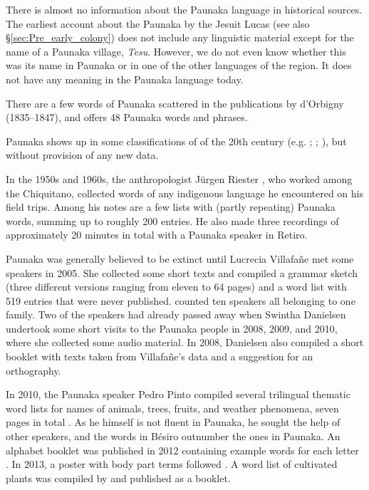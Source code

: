 There is almost no information about the Paunaka language in historical sources. The earliest account about the Paunaka by the Jesuit Lucas \citet[]{Matienzo_et_al2011} (see also §\ref{sec:Pre_early_colony}) does not include any linguistic material except for the name of a Paunaka village, \textit{Tesu}. However, we do not even know whether this was its name in Paunaka or in one of the other languages of the region. It does not have any meaning in the Paunaka language today.

There are a few words of Paunaka scattered in the publications by d’Orbigny (1835–1847), %
and \citet[308]{Cardus1886} offers 48 Paunaka words and phrases.

Paunaka shows up in some classifications of  of the 20th century (e.g. \citealt[213]{Mason1950}; %
\citealt[142]{Loukotka1968}; %
\citealt[67]{Aikhenvald1999}), but without provision of any new data.

In the 1950s and 1960s, the anthropologist Jürgen Riester%
, who worked among the Chiquitano, collected words of any indigenous language he encountered on his field trips. Among his notes are a few lists with (partly repeating) Paunaka words, summing up to roughly 200 entries. He also made three recordings of approximately 20 minutes in total with a Paunaka speaker in Retiro.

Paunaka was generally believed to be extinct until Lucrecia Villafañe %
met some speakers in 2005. She collected some short texts and compiled a grammar sketch (three different versions ranging from eleven to 64 pages) and a word list with 519 entries that were never published. \citet[1]{Villafanen.d.} counted ten speakers all belonging to one family. Two of the speakers had already passed away when Swintha Danielsen undertook some short visits to the Paunaka people in 2008, 2009, and 2010, where she collected some audio material. In 2008, Danielsen also compiled a short booklet with texts taken from Villafañe’s data and a suggestion for an orthography.

In 2010, the Paunaka speaker Pedro Pinto compiled several trilingual thematic word lists for names of animals, trees, fruits, and weather phenomena, seven pages in total \citep[]{Pinto2010}. As he himself is not fluent in Paunaka, he sought the help of other speakers, and the words in Bésiro outnumber the ones in Paunaka. An alphabet booklet was published in 2012 containing example words for each letter \citep[]{PDP2012}. In 2013, a poster with body part terms followed \citep[]{PDP2013}. A word list of cultivated plants was compiled by \citet[]{Sell2019} and published as a booklet.

